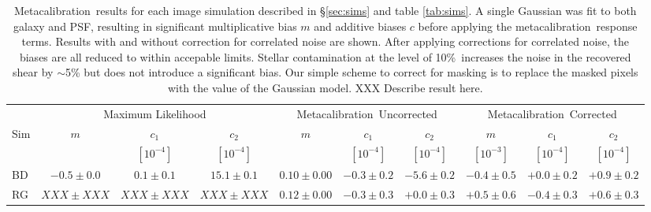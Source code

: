 \documentclass[usegraphicx,usenatbib]{mn2e}
\newcommand{\mcal}{metacalibration}
\newcommand{\Mcal}{Metacalibration}
\newcommand{\nsimNstarperc}{10\%}
\begin{document}
\begin{table}
    \centering
    \caption{\Mcal\ results for each image simulation described in
        \S \ref{sec:sims} and table \ref{tab:sims}.  A single Gaussian was fit
    to both galaxy and PSF, resulting in significant multiplicative 
    bias $m$ and additive biases $c$ before applying the \mcal\ response
    terms. Results with and without correction
    for correlated noise are shown.  After applying corrections for
    correlated noise, the biases are all reduced to within accepable limits.
    Stellar contamination at the level of \nsimNstarperc\ increases
    the noise in the recovered shear by $\sim$5\% but does not introduce 
    a significant bias.  
    Our simple scheme to correct for masking is to
    replace the masked pixels with the value of the Gaussian model.  XXX Describe
    result here.
    \label{tab:results}}
    \begin{tabular}{ |l|  c|c|c|  c|c|c|  c|c|c|}
        \hline
        & \multicolumn{3}{c}{Maximum Likelihood} & \multicolumn{3}{c}{\Mcal\ Uncorrected} & \multicolumn{3}{c}{\Mcal\ Corrected} \\
        Sim & $m$             & $c_1$         & $c_2$         & $m$             & $c_1$          & $c_2$          & $m$            & $c_1$           & $c_2$ \\
             &                 & $[10^{-4}]$   & $[10^{-4}]$   &                 & $[10^{-4}]$    & $[10^{-4}]$    & $[10^{-3}]$    & $[10^{-4}]$     & $[10^{-4}]$ \\
        \hline
        BD  & $-0.5 \pm 0.0$  & $0.1 \pm 0.1$ & $15.1 \pm 0.1$ & $0.10 \pm 0.00$ & $-0.3 \pm 0.2$ & $-5.6 \pm 0.2$ & $-0.4 \pm 0.5$  & $+0.0 \pm 0.2$ & $+0.9 \pm 0.2$  \\
        RG  & $XXX \pm XXX$   & $XXX \pm XXX$ & $XXX \pm XXX$ & $0.12 \pm 0.00$ & $-0.3 \pm 0.3$ & $+0.0 \pm 0.3$ & $+0.5 \pm 0.6$  & $-0.4 \pm 0.3$ & $+0.6 \pm 0.3$ \\
    \end{tabular}
\end{table}
\end{document}
